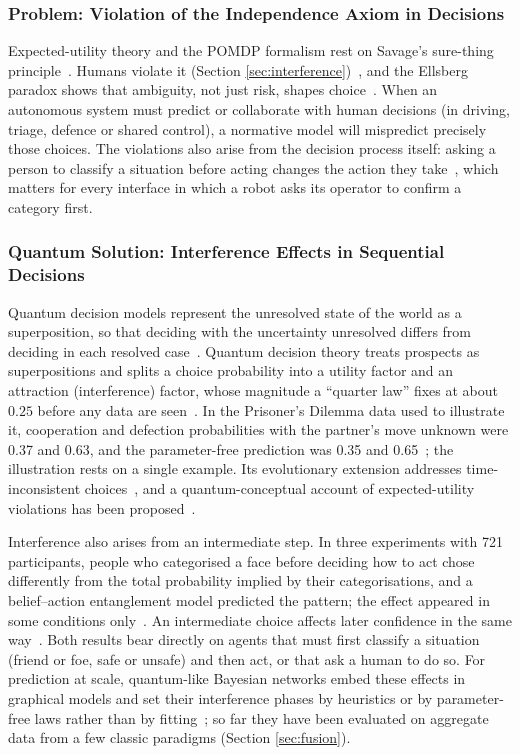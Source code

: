 \documentclass[pdflatex,sn-basic]{sn-jnl}
\begin{document}
\subsubsection{Problem: Violation of the Independence Axiom in Decisions}\label{sec:independence}
Expected-utility theory and the POMDP formalism rest on Savage's sure-thing principle~\citep{Savage1954}. Humans violate it (Section \ref{sec:interference})~\citep{Shafir1992}, and the Ellsberg paradox shows that ambiguity, not just risk, shapes choice~\citep{Ellsberg1961}. When an autonomous system must predict or collaborate with human decisions (in driving, triage, defence or shared control), a normative model will mispredict precisely those choices. The violations also arise from the decision process itself: asking a person to classify a situation before acting changes the action they take~\citep{Wang2016}, which matters for every interface in which a robot asks its operator to confirm a category first.

\subsubsection{Quantum Solution: Interference Effects in Sequential Decisions}
Quantum decision models represent the unresolved state of the world as a superposition, so that deciding with the uncertainty unresolved differs from deciding in each resolved case~\citep{Pothos2009,Busemeyer2012}. Quantum decision theory treats prospects as superpositions and splits a choice probability into a utility factor and an attraction (interference) factor, whose magnitude a ``quarter law'' fixes at about $0.25$ before any data are seen~\citep{Yukalov2011,Yukalov2016}. In the Prisoner's Dilemma data used to illustrate it, cooperation and defection probabilities with the partner's move unknown were 0.37 and 0.63, and the parameter-free prediction was 0.35 and 0.65~\citep{Yukalov2016}; the illustration rests on a single example. Its evolutionary extension addresses time-inconsistent choices~\citep{Yukalov2020}, and a quantum-conceptual account of expected-utility violations has been proposed~\citep{Aerts2011c}.

Interference also arises from an intermediate step. In three experiments with 721 participants, people who categorised a face before deciding how to act chose differently from the total probability implied by their categorisations, and a belief--action entanglement model predicted the pattern; the effect appeared in some conditions only~\citep{Wang2016}. An intermediate choice affects later confidence in the same way~\citep{Kvam2015}. Both results bear directly on agents that must first classify a situation (friend or foe, safe or unsafe) and then act, or that ask a human to do so. For prediction at scale, quantum-like Bayesian networks embed these effects in graphical models and set their interference phases by heuristics or by parameter-free laws rather than by fitting~\citep{Moreira2016,Wichert2020}; so far they have been evaluated on aggregate data from a few classic paradigms (Section \ref{sec:fusion}).
\end{document}
